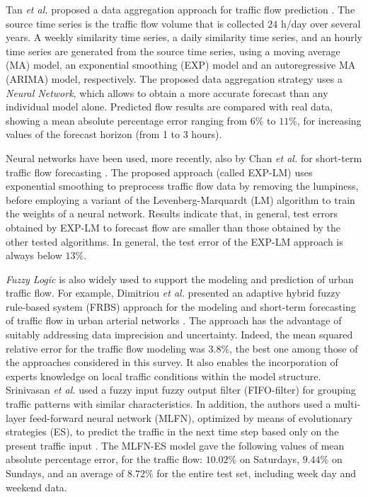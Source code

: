 \documentclass[10pt,onecolumn]{article}
\begin{document}
Tan \textit{et al.} proposed a data aggregation approach for traffic flow prediction \cite{Tan2009}. The source time series is the traffic flow volume that is collected $24$ h/day over several years. A weekly similarity time series, a daily similarity time series, and an hourly time series are generated from the source time series, using a moving average (MA) model, an exponential smoothing (EXP) model and an autoregressive MA (ARIMA) model, respectively. The proposed data aggregation strategy uses a \textit{Neural Network}, which allows to obtain a more accurate forecast than any individual model alone. Predicted flow results are compared with real data, showing a mean absolute percentage error ranging from $6\%$ to $11\%$, for increasing values of the forecast horizon (from 1 to 3 hours).

Neural networks have been used, more recently, also by Chan \textit{et al.} for short-term traffic flow forecasting \cite{Chan2012}. The proposed approach (called EXP-LM) uses exponential smoothing to preprocess traffic flow data by removing the lumpiness, before employing a variant of the Levenberg-Marquardt (LM) algorithm to train the weights of a neural network. Results indicate that, in general, test errors obtained by EXP-LM to forecast flow  are smaller than those obtained by the other tested algorithms. In general, the test error of the EXP-LM approach is always below $13 \%$.

\textit{Fuzzy Logic} is also widely used to support the modeling and prediction of urban traffic flow. For example, Dimitriou \textit{et al.} presented an adaptive hybrid fuzzy rule-based system (FRBS) approach for the modeling and short-term forecasting of traffic flow in urban arterial networks \cite{Dimitriou2008}. The approach has the advantage of suitably addressing data imprecision and uncertainty. Indeed, the mean squared relative error for the traffic flow modeling was $3.8\%$, the best one among those of the approaches considered in this survey. It also enables the incorporation of experts knowledge on local traffic conditions within the model structure.
Srinivasan \textit{et al.} used a fuzzy input fuzzy output filter (FIFO-filter) for grouping traffic patterns with similar characteristics. In addition, the authors used a multi-layer feed-forward neural network (MLFN), optimized by means of evolutionary strategies (ES), to predict the traffic in the next time step based only on the present traffic input \cite{Srinivasan2009}. The MLFN-ES model gave the following values of mean absolute percentage error, for the traffic flow: $10.02\%$ on Saturdays, $9.44\%$ on Sundays, and an average of $8.72\%$ for the entire test set, including week day and weekend data.
\end{document}
